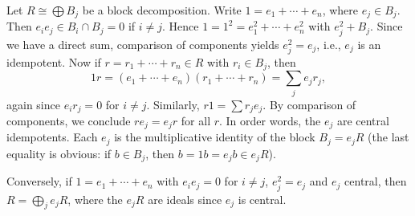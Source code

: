Let $R \cong \bigoplus B_j$ be a block decomposition. Write
$1 = e_1 + \cdots + e_n$, where $e_j \in B_j$. Then $e_ie_j \in B_i\cap B_j = 0$
if $i\neq j$. Hence $1 = 1^2 = e_1^2 + \cdots + e_n^2$ with $e_j^2 + B_j$. Since
we have a direct sum, comparison of components yields $e_j^2 = e_j$, i.e.,
$e_j$ is an idempotent. Now if $r = r_1 + \cdots + r_n \in R$ with $r_i  \in B_j$,
then
\[ 1r = (e_1 + \cdots + e_n)(r_1 + \cdots + r_n) = \sum_j e_jr_j, \]
again since $e_ir_j = 0$ for $i\neq j$. Similarly, $r1 = \sum r_je_j$. By comparison
of components, we conclude $re_j = e_jr$ for all $r$. In order words, the
$e_j$ are central idempotents. Each $e_j$ is the multiplicative identity of the
block $B_j = e_jR$ (the last equality is obvious: if $b \in B_j$, then $b = 1b = e_jb \in e_jR$).

Conversely, if $1 = e_1 + \cdots + e_n$ with $e_ie_j = 0$ for $i\neq j$, $e_j^2 = e_j$
and $e_j$ central, then $R = \bigoplus_j e_jR$, where the $e_jR$ are ideals since
$e_j$ is central.
